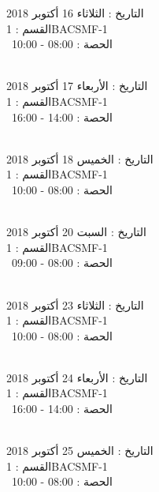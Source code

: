 \documentclass[14pt a4paper twocolumn]{book}
\begin{document}
التاريخ : الثلاثاء 16 أكتوبر 2018 \\
القسم : 1BACSMF-1 \\
 \  
الحصة : 08:00 - 10:00 \\
\par
\noindent\makebox[\linewidth]{\rule{\paperwidth}{0.4pt}}
 \\
التاريخ : الأربعاء 17 أكتوبر 2018 \\
القسم : 1BACSMF-1 \\
 \  
الحصة : 14:00 - 16:00 \\
\par
\noindent\makebox[\linewidth]{\rule{\paperwidth}{0.4pt}}
 \\
التاريخ : الخميس 18 أكتوبر 2018 \\
القسم : 1BACSMF-1 \\
 \  
الحصة : 08:00 - 10:00 \\
\par
\noindent\makebox[\linewidth]{\rule{\paperwidth}{0.4pt}}
 \\
التاريخ : السبت 20 أكتوبر 2018 \\
القسم : 1BACSMF-1 \\
 \  
الحصة : 08:00 - 09:00 \\
\par
\noindent\makebox[\linewidth]{\rule{\paperwidth}{0.4pt}}
 \\
التاريخ : الثلاثاء 23 أكتوبر 2018 \\
القسم : 1BACSMF-1 \\
 \  
الحصة : 08:00 - 10:00 \\
\par
\noindent\makebox[\linewidth]{\rule{\paperwidth}{0.4pt}}
 \\
التاريخ : الأربعاء 24 أكتوبر 2018 \\
القسم : 1BACSMF-1 \\
 \  
الحصة : 14:00 - 16:00 \\
\par
\noindent\makebox[\linewidth]{\rule{\paperwidth}{0.4pt}}
 \\
التاريخ : الخميس 25 أكتوبر 2018 \\
القسم : 1BACSMF-1 \\
 \  
الحصة : 08:00 - 10:00 \\
\end{document}
